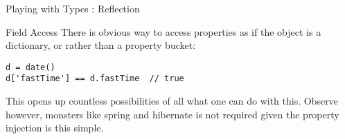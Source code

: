 \begin{section}{Playing with Types : Reflection}
\begin{subsection}{Field Access}
There is obvious way to access properties
as if the object is a dictionary, or rather than a property bucket:
\begin{lstlisting}[style=JexlStyle]
d = date()
d['fastTime'] == d.fastTime  // true 
\end{lstlisting}
This opens up countless possibilities of all what one can do with this.
Observe however, monsters like spring and hibernate is not required 
given the property injection is this simple. 
\end{subsection}



\end{section}























